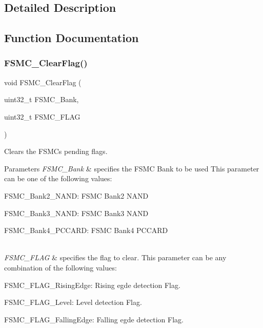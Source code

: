 \subsection{Detailed Description}


\subsection{Function Documentation}
\mbox{\label{group___f_s_m_c___exported___functions_ga697618f2de0ad9a8a82461ddbebd5264}} 
\subsubsection{\texorpdfstring{F\+S\+M\+C\+\_\+\+Clear\+Flag()}{FSMC\_ClearFlag()}}
{\footnotesize\ttfamily void F\+S\+M\+C\+\_\+\+Clear\+Flag (\begin{DoxyParamCaption}\item[{uint32\+\_\+t}]{F\+S\+M\+C\+\_\+\+Bank,  }\item[{uint32\+\_\+t}]{F\+S\+M\+C\+\_\+\+F\+L\+AG }\end{DoxyParamCaption})}



Clears the F\+S\+MC\textquotesingle{}s pending flags. 


\begin{DoxyParams}{Parameters}
{\em F\+S\+M\+C\+\_\+\+Bank} & specifies the F\+S\+MC Bank to be used This parameter can be one of the following values\+: \begin{DoxyItemize}
\item F\+S\+M\+C\+\_\+\+Bank2\+\_\+\+N\+A\+ND\+: F\+S\+MC Bank2 N\+A\+ND \item F\+S\+M\+C\+\_\+\+Bank3\+\_\+\+N\+A\+ND\+: F\+S\+MC Bank3 N\+A\+ND \item F\+S\+M\+C\+\_\+\+Bank4\+\_\+\+P\+C\+C\+A\+RD\+: F\+S\+MC Bank4 P\+C\+C\+A\+RD \end{DoxyItemize}
\\
\hline
{\em F\+S\+M\+C\+\_\+\+F\+L\+AG} & specifies the flag to clear. This parameter can be any combination of the following values\+: \begin{DoxyItemize}
\item F\+S\+M\+C\+\_\+\+F\+L\+A\+G\+\_\+\+Rising\+Edge\+: Rising egde detection Flag. \item F\+S\+M\+C\+\_\+\+F\+L\+A\+G\+\_\+\+Level\+: Level detection Flag. \item F\+S\+M\+C\+\_\+\+F\+L\+A\+G\+\_\+\+Falling\+Edge\+: Falling egde detection Flag. \end{DoxyItemize}
\\
\hline
\end{DoxyParams}

